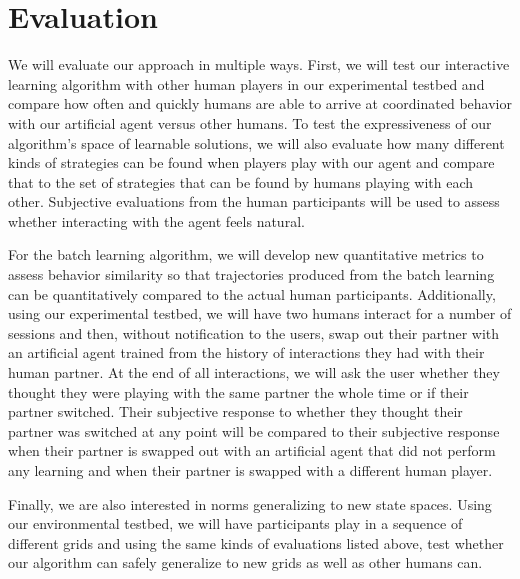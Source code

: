 
\section{Evaluation}

We will evaluate our approach in multiple ways. First, we will test
our interactive learning algorithm with other human players in our
experimental testbed and compare how often and quickly humans are able
to arrive at coordinated behavior with our artificial agent versus
other humans. To test the expressiveness of our algorithm's space of
learnable solutions, we will also evaluate how many different kinds of
strategies can be found when players play with our agent and compare
that to the set of strategies that can be found by humans playing with
each other.  Subjective evaluations from the human participants will
be used to assess whether interacting with the agent feels natural.

For the batch learning algorithm, we will develop new quantitative
metrics to assess behavior similarity so that trajectories produced
from the batch learning can be quantitatively compared to the actual
human participants. Additionally, using our experimental testbed, we
will have two humans interact for a number of sessions and then,
without notification to the users, swap out their partner with an
artificial agent trained from the history of interactions they had
with their human partner. At the end of all interactions, we will ask
the user whether they thought they were playing with the same partner
the whole time or if their partner switched. Their subjective response
to whether they thought their partner was switched at any point will
be compared to their subjective response when their partner is swapped
out with an artificial agent that did not perform any learning and
when their partner is swapped with a different human player.

Finally, we are also interested in norms generalizing to new state
spaces. Using our environmental testbed, we will have participants
play in a sequence of different grids and using the same kinds of
evaluations listed above, test whether our algorithm can safely
generalize to new grids as well as other humans can.
